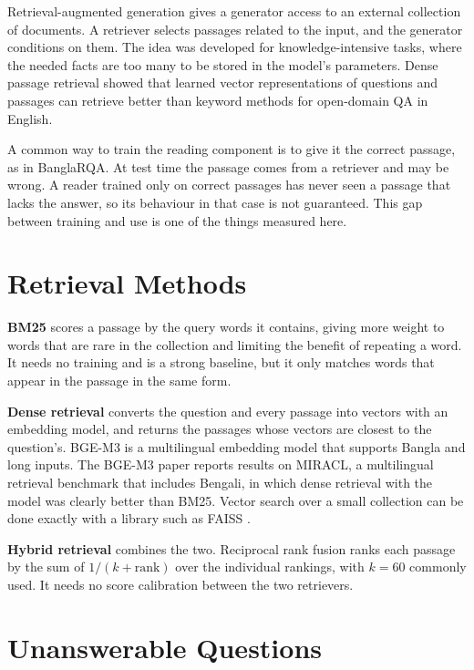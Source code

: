 Retrieval-augmented generation \cite{lewis2020rag} gives a generator access to an external collection of documents. A retriever selects passages related to the input, and the generator conditions on them. The idea was developed for knowledge-intensive tasks, where the needed facts are too many to be stored in the model's parameters. Dense passage retrieval \cite{karpukhin2020dpr} showed that learned vector representations of questions and passages can retrieve better than keyword methods for open-domain QA in English.

A common way to train the reading component is to give it the correct passage, as in BanglaRQA. At test time the passage comes from a retriever and may be wrong. A reader trained only on correct passages has never seen a passage that lacks the answer, so its behaviour in that case is not guaranteed. This gap between training and use is one of the things measured here.

\section{Retrieval Methods}

\textbf{BM25} \cite{robertson2009bm25} scores a passage by the query words it contains, giving more weight to words that are rare in the collection and limiting the benefit of repeating a word. It needs no training and is a strong baseline, but it only matches words that appear in the passage in the same form.

\textbf{Dense retrieval} converts the question and every passage into vectors with an embedding model, and returns the passages whose vectors are closest to the question's. BGE-M3 \cite{chen2024bgem3} is a multilingual embedding model that supports Bangla and long inputs. The BGE-M3 paper reports results on MIRACL, a multilingual retrieval benchmark that includes Bengali, in which dense retrieval with the model was clearly better than BM25. Vector search over a small collection can be done exactly with a library such as FAISS \cite{johnson2019faiss}.

\textbf{Hybrid retrieval} combines the two. Reciprocal rank fusion \cite{cormack2009rrf} ranks each passage by the sum of $1/(k + \text{rank})$ over the individual rankings, with $k = 60$ commonly used. It needs no score calibration between the two retrievers.

\section{Unanswerable Questions}

